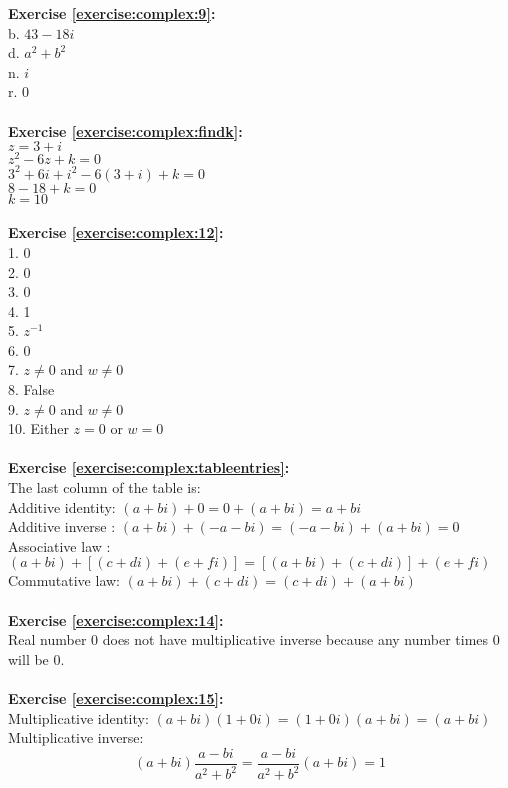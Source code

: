 \noindent\textbf{Exercise \ref{exercise:complex:9}:} \\
b. $43-18i$\\
d. $a^2+b^2$\\
n. $i$\\
r. 0\\
\\
\noindent\textbf{Exercise \ref{exercise:complex:findk}:} \\
$z=3+i$\\
$z^{2}-6z+k=0$\\
$3^{2}+6i+i^{2}-6(3+i)+k=0$\\
$8-18+k=0$\\
$k=10$\\
\\
\textbf{Exercise \ref{exercise:complex:12}:}\\
1. 0\\
2. 0\\
3. 0\\
4. 1\\
5. $z^{-1}$\\
6. 0\\
7. $z \neq 0$ and $w \neq 0$ \\
8. False\\
9. $z \neq 0$ and $w \neq 0$ \\
10. Either $z=0$ or $w=0$\\
\\
\textbf{Exercise \ref{exercise:complex:tableentries}:}\\
The last column of the table is:\\
Additive identity: $(a+bi)+0=0+(a+bi)=a+bi$\\
Additive inverse : $(a+bi)+(-a-bi)=(-a-bi)+(a+bi)=0$\\
Associative law  : $(a+bi)+[(c+di)+(e+fi)]=[(a+bi)+(c+di)]+(e+fi)$\\
Commutative law: $(a+bi)+(c+di)=(c+di)+(a+bi)$\\
\\
\textbf{Exercise \ref{exercise:complex:14}:}\\
Real number 0 does not have multiplicative inverse because any number times 0 will be 0.\\
\\
\textbf{Exercise \ref{exercise:complex:15}:}\\
Multiplicative identity: $(a+bi)(1+0i)=(1+0i)(a+bi)=(a+bi)$\\
Multiplicative inverse: $$(a+bi)\frac{a-bi}{a^{2}+b^{2}}= \frac{a-bi}{a^{2}+b^{2}}(a+bi)=1$$\\
